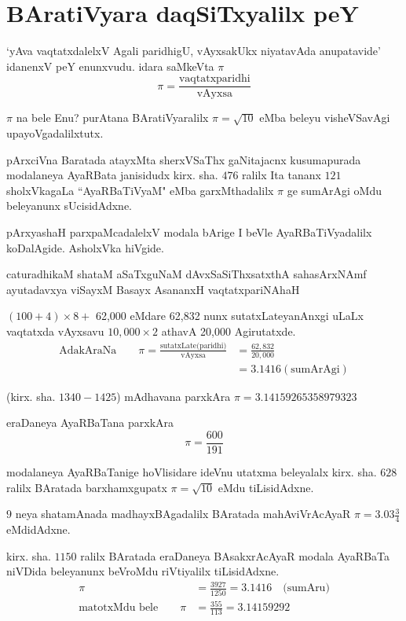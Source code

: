 \chapter{BAratiVyara daqSiTxyalilx peY}

`yAva vaqtatxdalelxV Agali paridhigU, vAyxsakUkx niyatavAda anupatavide' idanenxV peY enunxvudu. idara saMkeVta $\pi$
$$
\pi = \frac{\text{vaqtatxparidhi}}{\text{vAyxsa}}
$$

$\pi$ na bele Enu? purAtana BAratiVyaralilx $\pi = \sqrt{10}$ eMba beleyu visheVSavAgi upayoVgadalilxtutx.

pArxciVna Baratada atayxMta sherxVSaThx gaNitajacnx kusumapurada modalaneya AyaRBata janisidudx kirx. sha. $476$ ralilx Ita tananx $121$ sholxVkagaLa ``AyaRBaTiVyaM" eMba garxMthadalilx $\pi$ ge sumArAgi oMdu beleyanunx sUcisidAdxne.

pArxyashaH parxpaMcadalelxV modala bArige I beVle AyaRBaTiVyadalilx koDalAgide. AsholxVka hiVgide.

\begin{center}
caturadhikaM shataM aSaTxguNaM dAvxSaSiThxsatxthA sahasArxNAmf\\
ayutadavxya viSayxM Basayx AsananxH vaqtatxpariNAhaH
\end{center} 
 
$(100+4)\times 8 +$ {\rm 62,000} eMdare  {\rm 62,832} nunx sutatxLateyanAnxgi uLaLx vaqtatxda vAyxsavu $10,000\times 2$ athavA {\rm 20,000} Agirutatxde.
\begin{align*}
\text{AdakAraNa}\qquad \pi = \frac{\text{sutatxLate(paridhi)}}{\text{vAyxsa}} &= \frac{62,832}{20,000}\\
&= 3.1416(\text{sumArAgi}) 
 \end{align*} 

(kirx. sha. $1340-1425$) mAdhavana parxkAra $\pi = 3.14159265358979323 $ 

eraDaneya AyaRBaTana parxkAra
$$
\pi = \frac{600}{191}
$$

modalaneya AyaRBaTanige hoVlisidare ideVnu utatxma beleyalalx kirx. sha. $628$ ralilx BAratada barxhamxgupatx $\pi = \sqrt{10}$ eMdu tiLisidAdxne.

$9$ neya shatamAnada madhayxBAgadalilx BAratada mahAviVrAcAyaR $\pi = 3.03\frac{3}{4}$ eMdidAdxne.

kirx. sha. $1150$ ralilx BAratada eraDaneya BAsakxrAcAyaR modala AyaRBaTa niVDida beleyanunx beVroMdu riVtiyalilx tiLisidAdxne.
\begin{align*}
\pi &= \frac{3927}{1250} = 3.1416 \quad\text{(sumAru)}\\
\text{matotxMdu bele}\qquad \pi &= \frac{355}{113} = 3.14159292
\end{align*}

